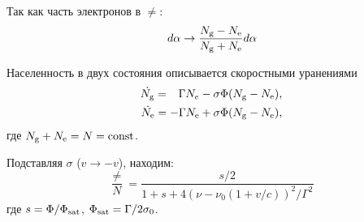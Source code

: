 Так как часть электронов в $\ne$:
\begin{equation*}
    \, d \alpha \to \frac{N_{\textnormal{g}}-N_{\textnormal{e}}}{N_{\textnormal{g}} + N_{\textnormal{e}}} d \alpha
\end{equation*}

Населенность в двух состояния описывается скоростными уранениями
\begin{align*}
    \dot{N_{\textnormal{g}}} = \phantom{-}\Gamma N_e - \sigma \Phi (N_{\textnormal{g}} - N_{\textnormal{e}}), \\
    \dot{N_{\textnormal{e}}} = - \Gamma N_{\textnormal{e}} + \sigma \Phi (N_{\textnormal{g}} - N_{\textnormal{e}}),
\end{align*}
где $N_{\textnormal{g}} + N_{\textnormal{e}} = N = \text{const} $.

Подставляя $\sigma$ ($v \to -v$), находим:
\begin{equation*}
    \frac{\ne}{N} = \frac{s/2}{1 + s + 4 (\nu - \nu_0(1+  v /c))^2/\Gamma^2}
\end{equation*}
где $s = \Phi/\Phi_{\textnormal{sat}}$, $\Phi_{\textnormal{sat}} = \Gamma/2 \sigma_0$.